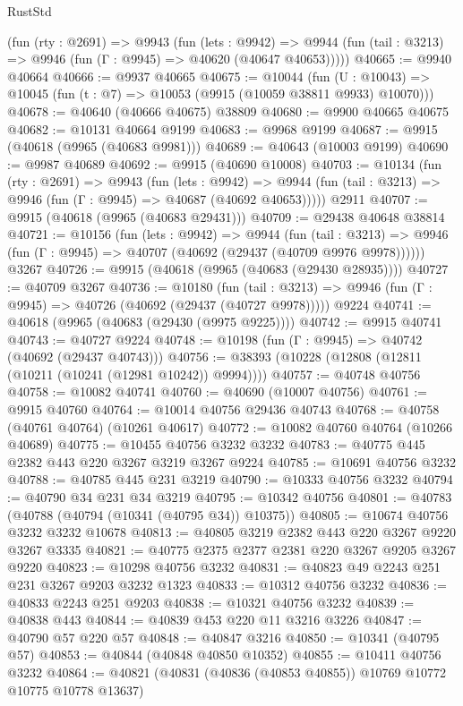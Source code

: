 \begin{lexlean}{RustStd}
\begin{coremodule}
    (fun (rty : @2691) =>
    @9943
      (fun (lets : @9942) =>
      @9944 (fun (tail : @3213) => @9946 (fun (Γ : @9945) => @40620 (@40647 @40653)))))
@40665 := @9940 @40664
@40666 := @9937 @40665
@40675 := @10044
    (fun (U : @10043) => @10045 (fun (t : @7) => @10053 (@9915 (@10059 @38811 @9933) @10070)))
@40678 := @40640 (@40666 @40675) @38809
@40680 := @9900 @40665 @40675
@40682 := @10131 @40664 @9199
@40683 := @9968 @9199
@40687 := @9915 (@40618 (@9965 (@40683 @9981)))
@40689 := @40643 (@10003 @9199)
@40690 := @9987 @40689
@40692 := @9915 (@40690 @10008)
@40703 := @10134
    (fun (rty : @2691) =>
    @9943
      (fun (lets : @9942) =>
      @9944 (fun (tail : @3213) => @9946 (fun (Γ : @9945) => @40687 (@40692 @40653)))))
    @2911
@40707 := @9915 (@40618 (@9965 (@40683 @29431)))
@40709 := @29438 @40648 @38814
@40721 := @10156
    (fun (lets : @9942) =>
    @9944
      (fun (tail : @3213) =>
      @9946 (fun (Γ : @9945) => @40707 (@40692 (@29437 (@40709 @9976 @9978))))))
    @3267
@40726 := @9915 (@40618 (@9965 (@40683 (@29430 @28935))))
@40727 := @40709 @3267
@40736 := @10180
    (fun (tail : @3213) => @9946 (fun (Γ : @9945) => @40726 (@40692 (@29437 (@40727 @9978)))))
    @9224
@40741 := @40618 (@9965 (@40683 (@29430 (@9975 @9225))))
@40742 := @9915 @40741
@40743 := @40727 @9224
@40748 := @10198 (fun (Γ : @9945) => @40742 (@40692 (@29437 @40743)))
@40756 := @38393 (@10228 (@12808 (@12811 (@10211 (@10241 (@12981 @10242)) @9994))))
@40757 := @40748 @40756
@40758 := @10082 @40741
@40760 := @40690 (@10007 @40756)
@40761 := @9915 @40760
@40764 := @10014 @40756 @29436 @40743
@40768 := @40758 (@40761 @40764) (@10261 @40617)
@40772 := @10082 @40760 @40764 (@10266 @40689)
@40775 := @10455 @40756 @3232 @3232
@40783 := @40775 @445 @2382 @443 @220 @3267 @3219 @3267 @9224
@40785 := @10691 @40756 @3232
@40788 := @40785 @445 @231 @3219
@40790 := @10333 @40756 @3232
@40794 := @40790 @34 @231 @34 @3219
@40795 := @10342 @40756
@40801 := @40783 (@40788 (@40794 (@10341 (@40795 @34)) @10375))
@40805 := @10674 @40756 @3232 @3232 @10678
@40813 := @40805 @3219 @2382 @443 @220 @3267 @9220 @3267 @3335
@40821 := @40775 @2375 @2377 @2381 @220 @3267 @9205 @3267 @9220
@40823 := @10298 @40756 @3232
@40831 := @40823 @49 @2243 @251 @231 @3267 @9203 @3232 @1323
@40833 := @10312 @40756 @3232
@40836 := @40833 @2243 @251 @9203
@40838 := @10321 @40756 @3232
@40839 := @40838 @443
@40844 := @40839 @453 @220 @11 @3216 @3226
@40847 := @40790 @57 @220 @57
@40848 := @40847 @3216
@40850 := @10341 (@40795 @57)
@40853 := @40844 (@40848 @40850 @10352)
@40855 := @10411 @40756 @3232
@40864 := @40821 (@40831 (@40836 (@40853 @40855)) @10769 @10772 @10775 @10778 @13637)

\end{coremodule}
\end{lexlean}
